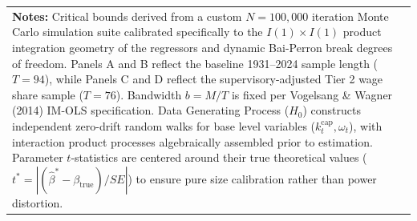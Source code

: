 \begin{table}[h!]
\begin{tabular}{p{4.2cm} p{2.6cm} p{2.2cm} p{2.2cm} p{2.2cm}}
\bottomrule
\multicolumn{5}{p{14.2cm}}{\footnotesize \textbf{Notes:} Critical bounds derived from a custom $N=100,000$ iteration Monte Carlo simulation suite calibrated specifically to the $I(1) \times I(1)$ product integration geometry of the regressors and dynamic Bai-Perron break degrees of freedom. Panels A and B reflect the baseline 1931--2024 sample length ($T=94$), while Panels C and D reflect the supervisory-adjusted Tier 2 wage share sample ($T=76$). Bandwidth $b = M/T$ is fixed per Vogelsang \& Wagner (2014) IM-OLS specification. Data Generating Process ($H_0$) constructs independent zero-drift random walks for base level variables ($k_t^{\text{cap}}, \omega_t$), with interaction product processes algebraically assembled prior to estimation. Parameter $t$-statistics are centered around their true theoretical values ($t^* = |(\hat{\beta}^* - \beta_{\text{true}})/SE|$) to ensure pure size calibration rather than power distortion.} \\
\end{tabular}
\end{table}
